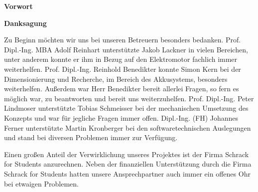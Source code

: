 \begin{center}
\begin{huge}
\textbf{Vorwort}
\end{huge}
\end{center}

\bigskip
{}


\newpage
\thispagestyle{empty}
\mbox{}
\newpage

\begin{center}
\begin{huge}
\textbf{Danksagung}
\end{huge}
\end{center}
\vspace{1cm}

Zu Beginn möchten wir uns bei unseren Betreuern besonders bedanken. Prof. Dipl.-Ing. MBA Adolf Reinhart unterstützte Jakob Lackner in vielen Bereichen, unter anderem konnte er ihm in Bezug auf den Elektromotor fachlich immer weiterhelfen. Prof. Dipl.-Ing. Reinhold Benedikter konnte Simon Kern bei der Dimensionierung und Recherche, im Bereich des Akkusystems, besonders weiterhelfen. Außerdem war Herr Benedikter bereit allerlei Fragen, so fern es möglich war, zu beantworten und bereit uns weiterzuhelfen. Prof. Dipl.-Ing. Peter Lindmoser unterstützte Tobias Schmeisser bei der mechanischen Umsetzung des Konzepts und war für jegliche Fragen immer offen. Dipl.-Ing. (FH) Johannes Ferner unterstützte Martin Kronberger bei den softwaretechnischen Auslegungen und stand bei diversen Problemen immer zur Verfügung.

Einen großen Anteil der Verwirklichung unseres Projektes ist der Firma Schrack for Students anzurechnen. Neben der finanziellen Unterstützung durch die Firma Schrack for Students hatten unsere Ansprechpartner auch immer ein offenes Ohr bei etwaigen Problemen.

